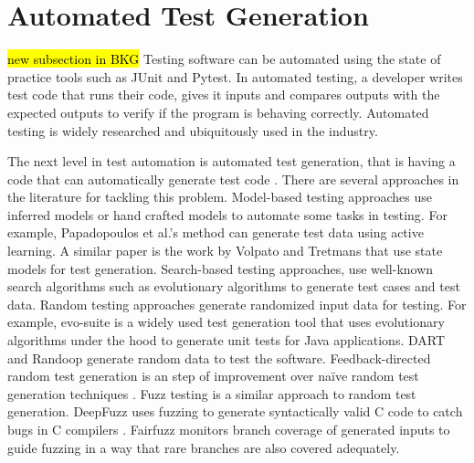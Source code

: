 \section{Automated Test Generation} \hl{new subsection in BKG}
Testing software can be automated using the state of practice tools such as JUnit and Pytest. In automated testing, a developer writes test code that runs their code, gives it inputs and compares outputs with the expected outputs to verify if the program is behaving correctly. 
Automated testing is widely researched and ubiquitously used in the industry. 

The next level in test automation is automated test generation, that is having a code that can automatically generate test code \cite{ibrahim2007automatic}. 
There are several approaches in the literature for tackling this problem. 
Model-based testing approaches use inferred models or hand crafted models to automate some tasks in testing. For example, Papadopoulos et al.'s method \cite{Papadopoulos2015} can generate test data using active learning. A similar paper is the work by Volpato and Tretmans \cite{volpato2014active} that use state models for test generation.
Search-based testing approaches, use well-known search algorithms such as evolutionary algorithms to generate test cases and test data. Random testing approaches generate randomized input data for testing.
For example, evo-suite is a widely used test generation tool that uses evolutionary algorithms under the hood \cite{fraser2011evosuite} to generate unit tests for Java applications. DART and Randoop \cite{Godefroid2005DART, pacheco2007randoop} generate random data to test the software. Feedback-directed random test generation is an step of improvement over naïve random test generation techniques \cite{pacheco2007feedback}.
Fuzz testing is a similar approach to random test generation. DeepFuzz uses fuzzing to generate syntactically valid C code to catch bugs in C compilers \cite{liu2019deepfuzz}. Fairfuzz \cite{lemieux2018fairfuzz} monitors branch coverage of generated inputs to guide fuzzing in a way that rare branches are also covered adequately.


